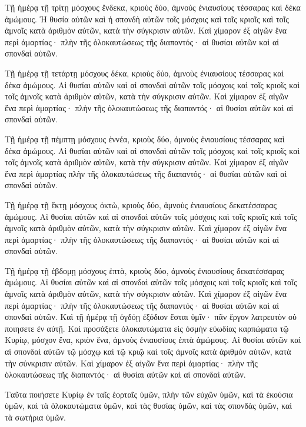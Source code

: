 {\par }{\PP {}Τῇ ἡμέρᾳ τῇ τρίτῃ μόσχους ἕνδεκα, κριοὺς δύο, ἀμνοὺς ἐνιαυσίους τέσσαρας καὶ δέκα ἀμώμους.
Ἡ θυσία αὐτῶν καὶ ἡ σπονδὴ αὐτῶν τοῖς μόσχοις καὶ τοῖς κριοῖς καὶ τοῖς ἀμνοῖς κατὰ ἀριθμὸν αὐτῶν, κατὰ τὴν σύγκρισιν αὐτῶν.
Καὶ χίμαρον ἐξ αἰγῶν ἕνα περὶ ἁμαρτίας· πλὴν τῆς ὁλοκαυτώσεως τῆς διαπαντός· αἱ θυσίαι αὐτῶν καὶ αἱ σπονδαὶ αὐτῶν.
\par }{\PP {}Τῇ ἡμέρᾳ τῇ τετάρτῃ μόσχους δέκα, κριοὺς δύο, ἀμνοὺς ἐνιαυσίους τέσσαρας καὶ δέκα ἀμώμους.
Αἱ θυσίαι αὐτῶν καὶ αἱ σπονδαὶ αὐτῶν τοῖς μόσχοις καὶ τοῖς κριοῖς καὶ τοῖς ἀμνοῖς κατὰ ἀριθμὸν αὐτῶν, κατὰ τὴν σύγκρισιν αὐτῶν.
Καὶ χίμαρον ἐξ αἰγῶν ἕνα περὶ ἁμαρτίας· πλὴν τῆς ὁλοκαυτώσεως τῆς διαπαντός· αἱ θυσίαι αὐτῶν καὶ αἱ σπονδαὶ αὐτῶν.
\par }{\PP {}Τῇ ἡμέρᾳ τῇ πέμπτῃ μόσχους ἐννέα, κριοὺς δύο, ἀμνοὺς ἐνιαυσίους τέσσαρας καὶ δέκα ἀμώμους.
Αἱ θυσίαι αὐτῶν καὶ αἱ σπονδαὶ αὐτῶν τοῖς μόσχοις καὶ τοῖς κριοῖς καὶ τοῖς ἀμνοῖς κατὰ ἀριθμὸν αὐτῶν, κατὰ τὴν σύγκρισιν αὐτῶν.
Καὶ χίμαρον ἐξ αἰγῶν ἕνα περὶ ἁμαρτίας πλὴν τῆς ὁλοκαυτώσεως τῆς διαπαντός· αἱ θυσίαι αὐτῶν καὶ αἱ σπονδαὶ αὐτῶν.
\par }{\PP {}Τῇ ἡμέρᾳ τῇ ἕκτῃ μόσχους ὀκτὼ, κριοὺς δύο, ἀμνοὺς ἐνιαυσίους δεκατέσσαρας ἀμώμους.
Αἱ θυσίαι αὐτῶν καὶ αἱ σπονδαὶ αὐτῶν τοῖς μόσχοις καὶ τοῖς κριοῖς καὶ τοῖς ἀμνοῖς κατὰ ἀριθμὸν αὐτῶν, κατὰ τὴν σύγκρισιν αὐτῶν.
Καὶ χίμαρον ἐξ αἰγῶν ἕνα περὶ ἁμαρτίας· πλὴν τῆς ὁλοκαυτώσεως τῆς διαπαντός· αἱ θυσίαι αὐτῶν καὶ αἱ σπονδαὶ αὐτῶν.
\par }{\PP {}Τῇ ἡμέρᾳ τῇ ἑβδομῃ μόσχους ἑπτὰ, κριοὺς δύο, ἀμνοὺς ἐνιαυσίους δεκατέσσαρας ἀμώμους.
Αἱ θυσίαι αὐτῶν καὶ αἱ σπονδαὶ αὐτῶν τοῖς μόσχοις καὶ τοῖς κριοῖς καὶ τοῖς ἀμνοῖς κατὰ ἀριθμὸν αὐτῶν, κατὰ τὴν σύγκρισιν αὐτῶν.
Καὶ χίμαρον ἐξ αἰγῶν ἕνα περὶ ἁμαρτίας· πλὴν τῆς ὁλοκαυτώσεως τῆς διαπαντός· αἱ θυσίαι αὐτῶν καὶ αἱ σπονδαὶ αὐτῶν.
Καὶ τῇ ἡμέρᾳ τῇ ὀγδόῃ ἐξόδιον ἔσται ὑμῖν· πᾶν ἔργον λατρευτὸν οὐ ποιησετε ἐν αὐτῇ.
Καὶ προσάξετε ὁλοκαυτώματα εἰς ὀσμὴν εὐωδίας καρπώματα τῷ Κυρίῳ, μόσχον ἕνα, κριὸν ἕνα, ἀμνοὺς ἐνιαυσίους ἑπτὰ ἀμώμους.
Αἱ θυσίαι αὐτῶν καὶ αἱ σπονδαὶ αὐτῶν τῷ μόσχῳ καὶ τῷ κριῷ καὶ τοῖς ἀμνοῖς κατὰ ἀριθμὸν αὐτῶν, κατὰ τὴν σύνκρισιν αὐτῶν.
Καὶ χίμαρον ἐξ αἰγῶν ἕνα περὶ ἁμαρτίας· πλὴν τῆς ὁλοκαυτώσεως τῆς διαπαντός· αἱ θυσίαι αὐτῶν καὶ αἱ σπονδαὶ αὐτῶν.
\par }{\PP {}Ταῦτα ποιήσετε Κυρίῳ ἐν ταῖς ἑορταῖς ὑμῶν, πλὴν τῶν εὐχῶν ὑμῶν, καὶ τὰ ἑκούσια ὑμῶν, καὶ τὰ ὁλοκαυτώματα ὑμῶν, καὶ τὰς θυσίας ὑμῶν, καὶ τὰς σπονδὰς ὑμῶν, καὶ τὰ σωτήρια ὑμῶν.

}
